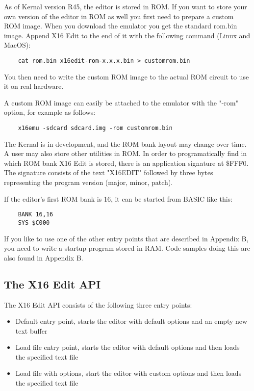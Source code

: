 \documentclass{article}
\begin{document}
        As of Kernal version R45, the editor is stored in ROM. If you want to store
        your own version of the editor in ROM as well you first need to prepare a custom ROM image. When you
        download the emulator you get the standard rom.bin image. Append
        X16 Edit to the end of it with the following command (Linux and MacOS):

\begin{verbatim}
    cat rom.bin x16edit-rom-x.x.x.bin > customrom.bin
\end{verbatim}

        You then need to write the custom ROM image to the actual ROM circuit to use it on
        real hardware.

        A custom ROM image can easily be attached to the emulator with
        the "-rom" option, for example as follows:

\begin{verbatim}
    x16emu -sdcard sdcard.img -rom customrom.bin
\end{verbatim}

    The Kernal is in development, and the ROM bank layout may change over time. A user
    may also store other utilities in ROM. In order to programatically find in which
    ROM bank X16 Edit is stored, there is an application signature at \$FFF0. The
    signature consists of the text "X16EDIT" followed by three bytes representing
    the program version (major, minor, patch).
        
    If the editor's first ROM bank is 16, it can be started from BASIC like this:

\begin{verbatim}
    BANK 16,16
    SYS $C000
\end{verbatim}

        If you like to use one of the other entry points that are described in Appendix B,
        you need to write a startup program stored in RAM. Code samples doing this
        are also found in Appendix B.

    \subsection{The X16 Edit API}
        The X16 Edit API consists of the following three entry points:

        \begin{itemize}
            \item Default entry point, starts the editor with default options and an empty new text buffer
            \item Load file entry point, starts the editor with default options and then loads the specified text file
            \item Load file with options, start the editor with custom options and then loads the specified text file
        \end{itemize}
\end{document}
